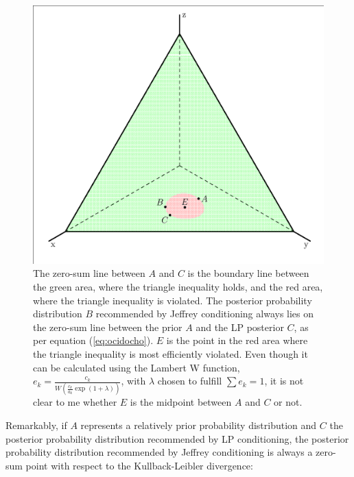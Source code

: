 \documentclass[smallextended]{svjour3}       %
\begin{document}
\begin{figure}[ht]
    \begin{minipage}[h]{.7\linewidth}
      \includegraphics[width=\textwidth]{dreieck.eps}
      \caption{The zero-sum line between $A$ and $C$ is the boundary
        line between the green area, where the triangle inequality
        holds, and the red area, where the triangle inequality is
        violated. The posterior probability distribution $B$
        recommended by Jeffrey conditioning always lies on the
        zero-sum line between the prior $A$ and the LP posterior $C$,
        as per equation (\ref{eq:ocidocho}). $E$ is the point in the
        red area where the triangle inequality is most efficiently
        violated. Even though it can be calculated using the Lambert W
        function,
        $e_{k}=\frac{c_{k}}{W\left(\frac{c_{k}}{a_{k}}\exp(1+\lambda)\right)}$,
        with $\lambda$ chosen to fulfill $\sum{}e_{k}=1$, it is not
        clear to me whether $E$ is the midpoint between $A$ and $C$ or
        not.}
      \label{fig:eugoohue}
\end{minipage}
\end{figure}

Remarkably, if $A$ represents a relatively prior probability
distribution and $C$ the posterior probability distribution
recommended by LP conditioning, the posterior probability distribution
recommended by Jeffrey conditioning is always a zero-sum point with
respect to the Kullback-Leibler divergence:
\end{document}

